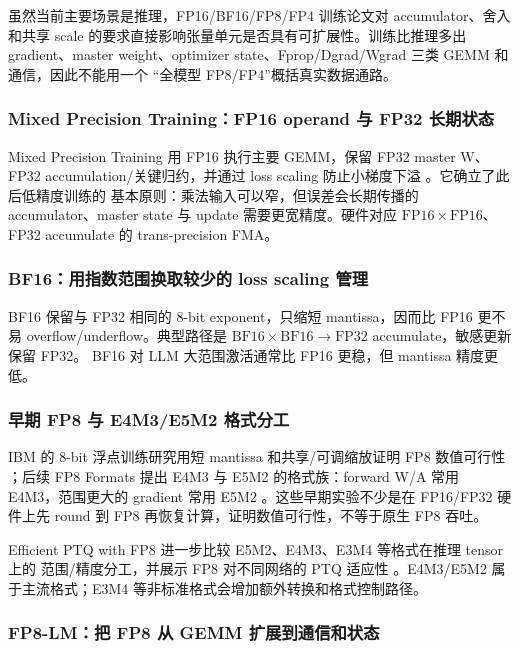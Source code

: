 虽然当前主要场景是推理，FP16/BF16/FP8/FP4 训练论文对 accumulator、舍入和共享
scale 的要求直接影响张量单元是否具有可扩展性。训练比推理多出 gradient、master
weight、optimizer state、Fprop/Dgrad/Wgrad 三类 GEMM 和通信，因此不能用一个
“全模型 FP8/FP4”概括真实数据通路。

\subsubsection{Mixed Precision Training：FP16 operand 与 FP32 长期状态}

Mixed Precision Training 用 FP16 执行主要 GEMM，保留 FP32 master W、FP32
accumulation/关键归约，并通过 loss scaling 防止小梯度下溢
。它确立了此后低精度训练的
基本原则：乘法输入可以窄，但误差会长期传播的 accumulator、master state 与 update
需要更宽精度。硬件对应 $\mathrm{FP16}\times\mathrm{FP16}$、FP32 accumulate 的 trans-precision FMA。

\subsubsection{BF16：用指数范围换取较少的 loss scaling 管理}

BF16 保留与 FP32 相同的 8-bit exponent，只缩短 mantissa，因而比 FP16 更不易
overflow/underflow。典型路径是
$\mathrm{BF16}\times\mathrm{BF16}\rightarrow\mathrm{FP32}$ accumulate，敏感更新保留 FP32。
BF16 对 LLM 大范围激活通常比 FP16 更稳，但 mantissa 精度更低。

\subsubsection{早期 FP8 与 E4M3/E5M2 格式分工}

IBM 的 8-bit 浮点训练研究用短 mantissa 和共享/可调缩放证明 FP8 数值可行性
；后续 FP8 Formats 提出 E4M3 与
E5M2 的格式族：forward W/A 常用 E4M3，范围更大的 gradient 常用 E5M2
。这些早期实验不少是在 FP16/FP32
硬件上先 round 到 FP8 再恢复计算，证明数值可行性，不等于原生 FP8 吞吐。

Efficient PTQ with FP8 进一步比较 E5M2、E4M3、E3M4 等格式在推理 tensor 上的
范围/精度分工，并展示 FP8 对不同网络的 PTQ 适应性
。E4M3/E5M2 属于主流格式；E3M4
等非标准格式会增加额外转换和格式控制路径。

\subsubsection{FP8-LM：把 FP8 从 GEMM 扩展到通信和状态}

